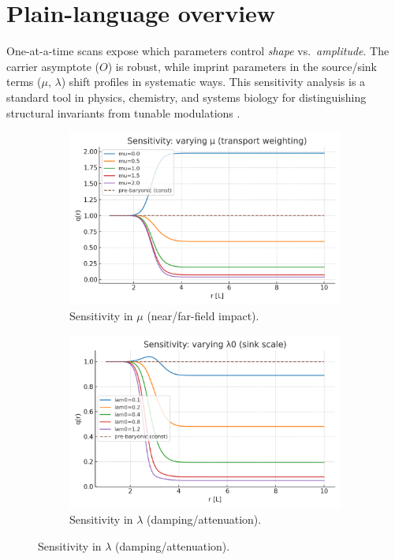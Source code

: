 \documentclass[12pt,a4paper,oneside]{scrreprt}
\begin{document}
\section*{Plain-language overview}
One-at-a-time scans expose which parameters control \emph{shape} vs.\ \emph{amplitude}.  
The carrier asymptote ($O$) is robust, while imprint parameters in the source/sink terms ($\mu$, $\lambda$) shift profiles in systematic ways. 
This sensitivity analysis is a standard tool in physics, chemistry, and systems biology for distinguishing structural invariants from tunable modulations \cite{Saltelli2000,ApS2008,Marino2008}. 

\begin{figure}[htbp]\centering
  \begin{subfigure}[t]{0.49\linewidth}
    \includegraphics[width=\linewidth]{sensitivity_q_mu.png}
    \caption{Sensitivity in $\mu$ (near/far-field impact).}
    \label{fig:sens:mu}
  \end{subfigure}\hfill
  \begin{subfigure}[t]{0.49\linewidth}
    \includegraphics[width=\linewidth]{sensitivity_q_lam0.png}
    \caption{Sensitivity in $\lambda$ (damping/attenuation).}
    \label{fig:sens:lam}
  \end{subfigure}
\end{figure}
\end{document}
